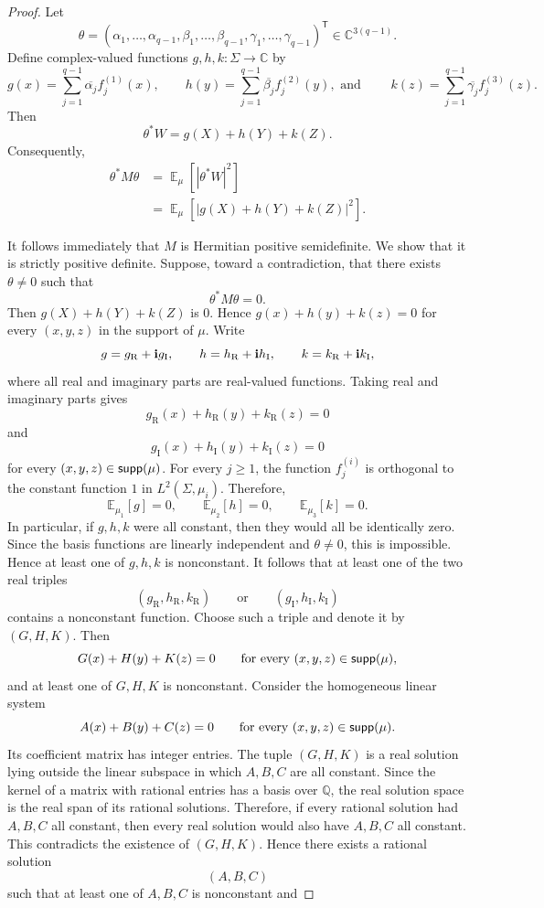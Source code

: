 \documentclass[11pt]{article}
\newcommand\Expect[2]{{\mathop{\mathbb{E}}_{#1}\left[ {#2} \right]}}
\renewcommand\geq{\geqslant}
\begin{document}
\begin{proof}
Let
\[ \theta= (\alpha_1,\ldots,\alpha_{q-1}, \beta_1,\ldots,\beta_{q-1}, \gamma_1,\ldots,\gamma_{q-1})^{\mathsf T} \in\mathbb{C}^{3(q-1)}. \] 
%
Define complex-valued functions $g,h,k:\Sigma\to\mathbb{C}$ by 
%
\[ g(x) = \sum_{j=1}^{q-1}\overline{\alpha_j}f^{(1)}_j(x), \quad\quad h(y) = \sum_{j=1}^{q-1}\overline{\beta_j}f^{(2)}_j(y),  \mbox{ and } \quad\quad k(z) = \sum_{j=1}^{q-1}\overline{\gamma_j}f^{(3)}_j(z). \] 
Then 
\[ \theta^*W=g(X)+h(Y)+k(Z). \] 
Consequently, 
\[ \begin{aligned} \theta^*M\theta &= \Expect{\mu}{ \left| \theta^*W \right|^2 }\\ &=  \Expect{\mu}{\left| g(X)+h(Y)+k(Z)  \right|^2}. \end{aligned} \] 

It follows immediately that $M$ is Hermitian positive semidefinite. We show that it is strictly positive definite. Suppose, toward a contradiction, that there exists $\theta\neq 0$ such that 
\[ \theta^*M\theta=0. \] 
Then $g(X)+h(Y)+k(Z)$ is $0$. Hence $g(x)+h(y)+k(z)=0$ for every $(x,y,z)$ in the support of $\mu$. 
Write 
\[ g=g_{\mathrm R}+{\bf i}g_{\mathrm I},\qquad h=h_{\mathrm R}+{\bf i}h_{\mathrm I},\qquad k=k_{\mathrm R}+{\bf i}k_{\mathrm I}, \]
%
where all real and imaginary parts are real-valued functions. Taking real and imaginary parts gives 
\[ g_{\mathrm R}(x)+h_{\mathrm R}(y)+k_{\mathrm R}(z) = 0 \]
and 
\[ g_{\mathrm I}(x)+h_{\mathrm I}(y)+k_{\mathrm I}(z) =0 \]
for every $(x,y,z)\in {\sf supp}(\mu)$. For every $j\geq 1$, the function $f^{(i)}_j$ is orthogonal to the constant function $1$ in $L^2(\Sigma,\mu_i)$. Therefore, 
\[ \mathbb{E}_{\mu_1}[g]=0,\qquad \mathbb{E}_{\mu_2}[h]=0,\qquad \mathbb{E}_{\mu_3}[k]=0. \]
%
In particular, if $g,h,k$ were all constant, then they would all be identically zero. Since the basis functions are linearly independent and $\theta\neq 0$, this is impossible. Hence at least one of $g,h,k$ is nonconstant. It follows that at least one of the two real triples 
\[ (g_{\mathrm R},h_{\mathrm R},k_{\mathrm R}) \qquad\text{or}\qquad (g_{\mathrm I},h_{\mathrm I},k_{\mathrm I}) \]
contains a nonconstant function. Choose such a triple and denote it by $(G,H,K)$. Then 
\[ G(x)+H(y)+K(z)=0 \qquad \text{for every }(x,y,z)\in {\sf supp}(\mu), \]
and at least one of $G,H,K$ is nonconstant. Consider the homogeneous linear system 
\[ A(x)+B(y)+C(z)=0 \qquad \text{for every }(x,y,z)\in {\sf supp}(\mu). \]
Its coefficient matrix has integer entries. The tuple $(G,H,K)$ is a real solution lying outside the linear subspace in which $A,B,C$ are all constant. Since the kernel of a matrix with rational entries has a basis over $\mathbb{Q}$, the real solution space is the real span of its rational solutions. Therefore, if every rational solution had $A,B,C$ all constant, then every real solution would also have $A,B,C$ all constant. This contradicts the existence of $(G,H,K)$. Hence there exists a rational solution \[ (A,B,C) \] such that at least one of $A,B,C$ is nonconstant and 

\end{proof}
\end{document}
